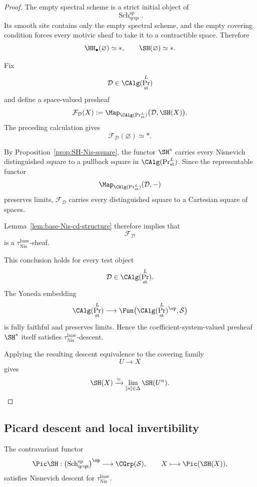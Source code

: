 \begin{proof}
The empty spectral scheme is a strict initial object of
\[
    \operatorname{Sch}^{\mathrm{sp}}_{\mathrm{qcqs}}.
\]
Its smooth site contains only the empty spectral scheme, and the empty
covering condition forces every motivic sheaf to take it to a contractible
space.  Therefore
\[
    \HH_\bullet(\varnothing)\simeq *,
    \qquad
    \SH(\varnothing)\simeq *.
\]

Fix
\[
    \mathcal D
    \in
    \CAlg(\Pr^L_{\mathrm{st}})
\]
and define a space-valued presheaf
\[
    \mathcal F_{\mathcal D}(X)
    :=
    \Map_{\CAlg(\Pr^L_{\mathrm{st}})}
    \bigl(
      \mathcal D,
      \SH(X)
    \bigr).
\]
The preceding calculation gives
\[
    \mathcal F_{\mathcal D}(\varnothing)
    \simeq
    *.
\]

By Proposition~\ref{prop:SH-Nis-square}, the functor \(\SH^*\) carries every
Nisnevich distinguished square to a pullback square in
\(\CAlg(\Pr^L_{\mathrm{st}})\).  Since the representable functor
\[
    \Map_{\CAlg(\Pr^L_{\mathrm{st}})}
    (\mathcal D,-)
\]
preserves limits, \(\mathcal F_{\mathcal D}\) carries every distinguished
square to a Cartesian square of spaces.

Lemma~\ref{lem:base-Nis-cd-structure} therefore implies that
\[
    \mathcal F_{\mathcal D}
\]
is a \(\tau_{\mathrm{Nis}}^{\mathrm{base}}\)-sheaf.

This conclusion holds for every test object
\[
    \mathcal D
    \in
    \CAlg(\Pr^L_{\mathrm{st}}).
\]
The Yoneda embedding
\[
    \CAlg(\Pr^L_{\mathrm{st}})
    \longrightarrow
    \Fun
    \bigl(
      \CAlg(\Pr^L_{\mathrm{st}})^{\op},
      \mathcal S
    \bigr)
\]
is fully faithful and preserves limits.  Hence the coefficient-system-valued
presheaf \(\SH^*\) itself satisfies
\(\tau_{\mathrm{Nis}}^{\mathrm{base}}\)-descent.

Applying the resulting descent equivalence to the covering family
\[
    U\longrightarrow X
\]
gives
\[
    \SH(X)
    \xrightarrow{\simeq}
    \lim_{[n]\in\Delta}
    \SH(U^n).
\]
\end{proof}

\subsection{Picard descent and local invertibility}

\begin{proposition}
\label{prop:Pic-descent}
The contravariant functor
\[
    \Pic\SH:
    \bigl(
      \operatorname{Sch}^{\mathrm{sp}}_{\mathrm{qcqs}}
    \bigr)^{\op}
    \longrightarrow
    \CGrp(\mathcal S),
    \qquad
    X\longmapsto\Pic(\SH(X)),
\]
satisfies Nisnevich descent for
\(\tau_{\mathrm{Nis}}^{\mathrm{base}}\).
\end{proposition}

